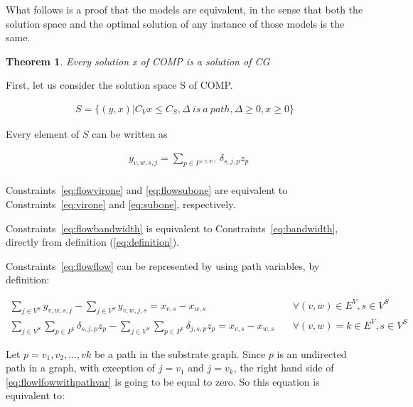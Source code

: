 \documentclass{article}
\newtheorem{theorem}{Theorem}[section]
\begin{document}
What follows is a proof that the models are equivalent, in the sense that both
the solution space and the optimal solution of any instance of those models is
the same.

\begin{theorem}
  Every solution x of COMP is a solution of CG
\end{theorem}

First, let us consider the solution space S of COMP.

\begin{align}
  S = \{ (y, x) | C_{V} x \leq C_{S}, \Delta~is~a~path, \Delta \geq 0, x \geq 0 \} 
\end{align}

Every element of $S$ can be written as

\begin{align}
        & y_{v,w,s,j} = \sum\limits_{p \in P^{(v,w)}} \delta_{s,j,p} z_{p} \label{eq:definition} \\
\end{align}


Constraints~\ref{eq:flowvirone} and \ref{eq:flowsubone} are equivalent to
Constraints~\ref{eq:virone} and \ref{eq:subone}, respectively.

Constraints~\eqref{eq:flowbandwidth} is equivalent to Constraints~\eqref{eq:bandwidth},
directly from definition (\ref{eq:definition}).

Constraints~\ref{eq:flowflow} can be represented by using path variables, by definition:

\begin{align}
  \sum\limits_{j \in V^{S}} y_{v,w,s,j} - \sum\limits_{j \in V^{S}} y_{v,w,j,s} = x_{v,s} - x_{w,s}     & \quad \forall (v,w) \in E^{V}, s \in V^{S} \\
  \sum\limits_{j \in V^{S}} \sum\limits_{p \in P^k} \delta_{s,j,p} z_{p} - \sum\limits_{j \in V^{S}}\sum\limits_{p \in P^k} \delta_{j,s,p} z_{p} = x_{v,s} - x_{w,s}     & \quad \forall (v,w) = k \in E^{V}, s \in V^{S} \label{eq:flowlfowwithpathvar}
\end{align}

Let $p = v_{1},v_{2},\ldots,v{k}$ be a path in the substrate graph. Since $p$
is an undirected path in a graph, with exception of $j = v_{1}$ and $ j = v_{k}$,
the right hand side of \ref{eq:flowlfowwithpathvar} is going to be equal 
to zero. So this equation is equivalent to:
\end{document}

